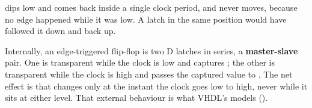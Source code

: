 
\noindent{} dips low and comes back inside a single clock period, and  never moves,
because no edge happened while it was low. A latch in the same position would have followed it down
and back up.

Internally, an edge-triggered flip-flop is two D latches in series, a \textbf{master-slave} pair. One
is transparent while the clock is low and captures ; the other is transparent while the clock
is high and passes the captured value to . The net effect is that  changes only at
the instant the clock goes low to high, never while it sits at either level. That external behaviour
is what VHDL's  models ().

